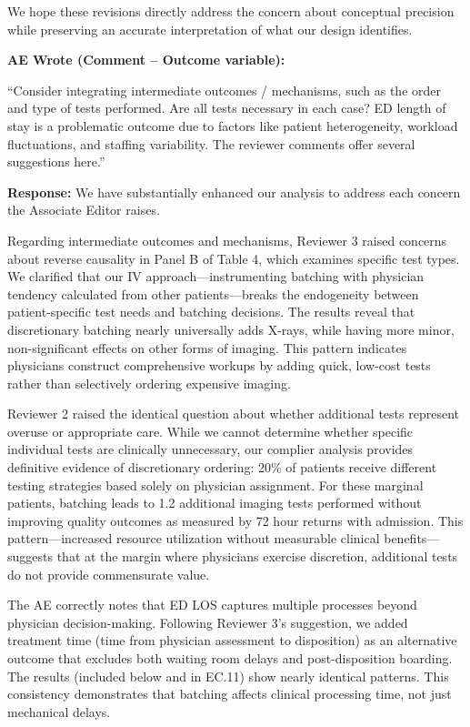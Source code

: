 \documentclass[11pt]{article}
\newenvironment{quote2}
{ \bigskip
\noindent
         \small\em
         \baselineskip=14pt
}
\newcommand{\1}{\hbox{\rm 1\kern-.35em 1}}
\begin{document}
We hope these revisions directly address the concern about conceptual precision while preserving an accurate interpretation of what our design identifies.

\color{black}

\begin{quote2}
\textbf{AE Wrote (Comment – Outcome variable):} 

\noindent``Consider integrating intermediate outcomes / mechanisms, such as the order and type of tests performed. Are all tests necessary in each case? ED length of stay is a problematic outcome due to factors like patient heterogeneity, workload fluctuations, and staffing variability. The reviewer comments offer several suggestions here.'' 

\end{quote2}

\noindent\textbf{Response:} \color{blue}We have substantially enhanced our analysis to address each concern the Associate Editor raises.

Regarding intermediate outcomes and mechanisms, Reviewer 3 raised concerns about reverse causality in Panel B of Table 4, which examines specific test types. We clarified that our IV approach---instrumenting batching with physician tendency calculated from other patients---breaks the endogeneity between patient-specific test needs and batching decisions. The results reveal that discretionary batching nearly universally adds X-rays, while having more minor, non-significant effects on other forms of imaging. This pattern indicates physicians construct comprehensive workups by adding quick, low-cost tests rather than selectively ordering expensive imaging.

Reviewer 2 raised the identical question about whether additional tests represent overuse or appropriate care. While we cannot determine whether specific individual tests are clinically unnecessary, our complier analysis provides definitive evidence of discretionary ordering: 20\% of patients receive different testing strategies based solely on physician assignment. For these marginal patients, batching leads to 1.2 additional imaging tests performed without improving quality outcomes as measured by 72 hour returns with admission. This pattern—increased resource utilization without measurable clinical benefits—suggests that at the margin where physicians exercise discretion, additional tests do not provide commensurate value.

The AE correctly notes that ED LOS captures multiple processes beyond physician decision-making. Following Reviewer 3's suggestion, we added treatment time (time from physician assessment to disposition) as an alternative outcome that excludes both waiting room delays and post-disposition boarding. The results (included below and in EC.11) show nearly identical patterns. This consistency demonstrates that batching affects clinical processing time, not just mechanical delays.
\end{document}

